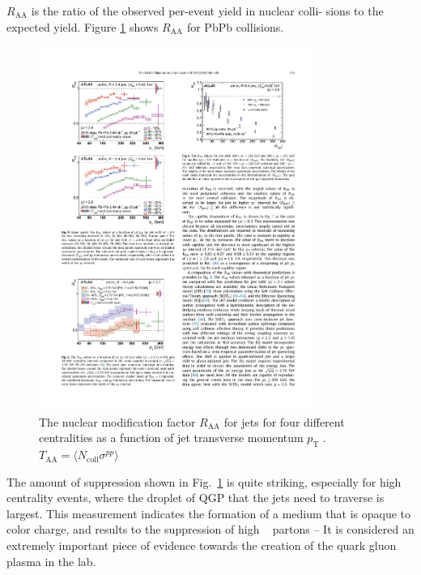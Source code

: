   $R_\mathrm{AA}$ is the ratio of the observed per-event yield in nuclear colli- sions to the expected yield. Figure \ref{fig:atlas_raa} shows $R_\mathrm{AA}$ for PbPb collisions.
  \begin{figure}[htpb]
    \centering
    \includegraphics[width=0.8\textwidth]{Introduction/atlas_raa.pdf}
    \caption{The nuclear modification factor $R_\mathrm{AA}$ for jets for four different centralities as a function of jet transverse momentum $p_\mathrm{T}$ \cite{Aaboud2019}. $T_\mathrm{AA} = \langle N_\mathrm{coll}\sigma^{pp}\rangle$}
    \label{fig:atlas_raa}
  \end{figure}
  The amount of suppression shown in Fig.~\ref{fig:atlas_raa} is quite striking, especially for high centrality events, where the droplet of QGP that the jets need to traverse is largest. This measurement indicates the formation of a medium that is opaque to color charge, and results to the suppression of high \pT~ partons -- It is considered an extremely important piece of evidence towards the creation of the quark gluon plasma in the lab. 

